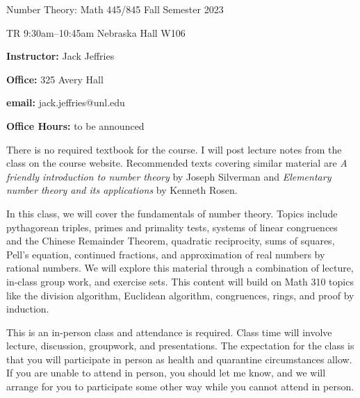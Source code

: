 \documentclass{amsart}
\begin{document}
 








\centerline{\bigbf Number Theory: Math 445/845 Fall Semester 2023}
\centerline{\bigbf TR 9:30am–10:45am Nebraska Hall W106}


\bigskip


\begin{multicols}{2}
\noindent
{\bf Instructor:}  Jack Jeffries

\noindent
{\bf Office:} 325 Avery Hall

\noindent
{\bf email:} jack.jeffries@unl.edu

\noindent
{\bf Office Hours:} to be announced
\end{multicols}




There is no required textbook for the course. I will post lecture notes from the class on the course website. Recommended texts covering similar material are
\emph{A friendly introduction to number theory} by Joseph Silverman and
\emph{Elementary number theory and its applications} by Kenneth Rosen.


\medskip


In this class, we will cover the fundamentals of number theory. Topics include pythagorean triples, primes and primality tests, systems of linear congruences and the Chinese Remainder Theorem, quadratic reciprocity, sums of squares, Pell's equation, continued fractions, and approximation of real numbers by rational numbers. We will explore this material through a combination of lecture, in-class group work, and exercise sets. This content will build on Math 310 topics like the division algorithm, Euclidean algorithm, congruences, rings, and proof by induction.


\smallskip

This is an in-person class and attendance is required. Class time will involve lecture, discussion, groupwork, and presentations. The expectation for the class is that you will participate in person as health and quarantine circumstances allow. If you are unable to attend in person, you should let me know, and we will arrange for you to participate some other way while you cannot attend in person.
\end{document}
